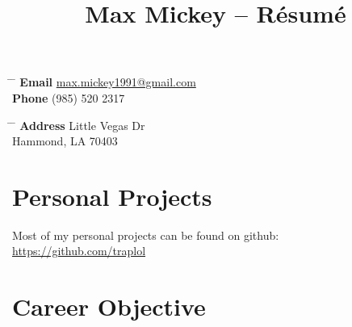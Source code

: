 \documentclass[10pt]{article} %
\begin{document}

\title{Max Mickey -- Résumé} %


\parbox{0.5\textwidth}{ %
\begin{tabbing} %
\hspace{2cm} \= \hspace{3cm} \= \kill %
\textbf {Email} \> \href{mailto:max.mickey1991@gmail.com}{max.mickey1991@gmail.com} \\ %
\textbf {Phone} \> (985) 520 2317 \\ %
\end{tabbing}}
\hfill %
\parbox{0.5\textwidth}{ %
\begin{tabbing} %
\hspace{2cm} \= \hspace{3cm} \= \kill %
\textbf {Address}  Little Vegas Dr\\ %
\> Hammond, LA 70403 \\ %
\end{tabbing}}


\section{Personal Projects}
\vspace{-3mm}

Most of my personal projects can be found on github: \\
\href{https://github.com/traplol}{https://github.com/traplol}

\vspace{-4mm}
\section{Career Objective}
\vspace{-3mm}
\end{document}
